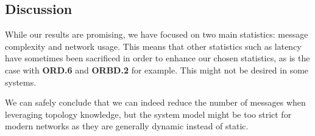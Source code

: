 \subsection{Discussion}

While our results are promising, we have focused on two main statistics: message complexity and network usage. This means that other statistics such as latency have sometimes been sacrificed in order to enhance our chosen statistics, as is the case with \textbf{ORD.6} and \textbf{ORBD.2} for example. This might not be desired in some systems.

We can safely conclude that we can indeed reduce the number of messages when leveraging topology knowledge, but the system model might be too strict for modern networks as they are generally dynamic instead of static. 